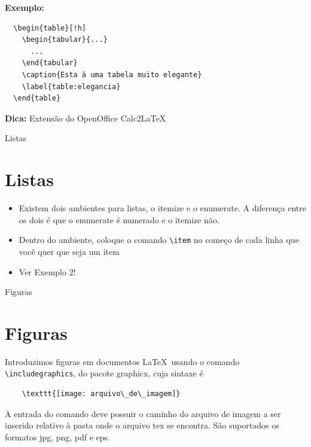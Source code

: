 \documentclass[12pt]{beamer}
\begin{document}
\begin{frame}[fragile]
  \textbf{Exemplo:}
  \begin{verbatim}
  \begin{table}[!h]
    \begin{tabular}{...}
      ...
    \end{tabular}
    \caption{Esta á uma tabela muito elegante}
    \label{table:elegancia}
  \end{table}
  \end{verbatim}

  \textbf{Dica:} Extensão do OpenOffice Calc2LaTeX
\end{frame}

\begin{frame}[fragile]{Listas}
  \section{Listas}
  \begin{itemize}
    \item Existem dois ambientes para listas, o itemize e o enumerate. A diferença entre os dois é que o enumerate é numerado e o itemize não.
    \item Dentro do ambiente, coloque o comando \verb+\item+ no começo de cada linha que você quer que seja um item
    \item Ver Exemplo 2!
  \end{itemize}
\end{frame}

\begin{frame}[fragile]{Figuras}
  \section{Figuras}
  Introduzimos figuras em documentos \LaTeX\ usando o comando \verb+\includegraphics+, do pacote graphicx, cuja sintaxe é
  \begin{verbatim}
    \texttt{[image: arquivo\_de\_imagem]}
  \end{verbatim}
  
  A entrada do comando deve possuir o caminho do arquivo de imagem a ser inserido relativo à pasta onde o arquivo tex se encontra. São suportados os formatos jpg, png, pdf e eps.  

\end{frame}
\end{document}
